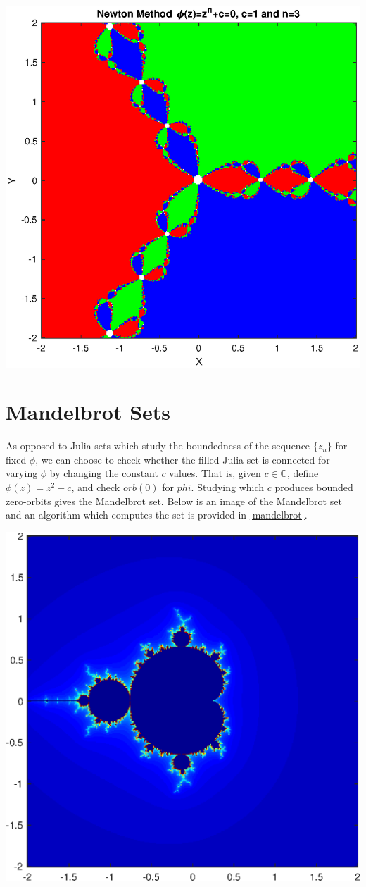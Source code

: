 \documentclass[12pt]{article}
\def\C{\mathbb{C}}
\begin{document}
\begin{center}\includegraphics[width=0.7\linewidth]{NMJS.eps} \end{center}

\section{Mandelbrot Sets}
As opposed to Julia sets which study the boundedness of the sequence $\{z_n\}$ for fixed $\phi$, we can choose to check whether the filled Julia set is connected for varying $\phi$ by changing the constant $c$ values. That is, given $c\in \C$, define $\phi(z)=z^2+c$, and check $orb(0)$ for $phi$. Studying which $c$ produces bounded zero-orbits gives the Mandelbrot set. Below is an image of the Mandelbrot set and an algorithm which computes the set is provided in \ref{mandelbrot}. \\
 
 \begin{center} \includegraphics [width=0.5\linewidth]{Mandelbrot_01.eps} \end{center}
 
\end{document}
